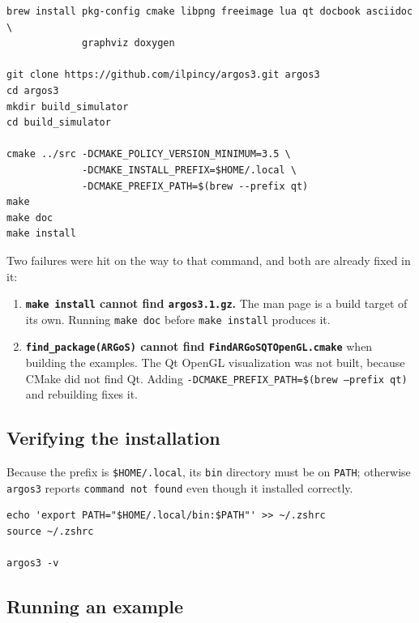 \begin{lstlisting}[style=shell,caption={Dependencies and source build.}]
brew install pkg-config cmake libpng freeimage lua qt docbook asciidoc \
             graphviz doxygen

git clone https://github.com/ilpincy/argos3.git argos3
cd argos3
mkdir build_simulator
cd build_simulator

cmake ../src -DCMAKE_POLICY_VERSION_MINIMUM=3.5 \
             -DCMAKE_INSTALL_PREFIX=$HOME/.local \
             -DCMAKE_PREFIX_PATH=$(brew --prefix qt)
make
make doc
make install
\end{lstlisting}

Two failures were hit on the way to that command, and both are already fixed in
it:

\begin{enumerate}
  \item \textbf{\texttt{make install} cannot find \texttt{argos3.1.gz}.} The man
        page is a build target of its own. Running \texttt{make doc} before
        \texttt{make install} produces it.
  \item \textbf{\texttt{find\_package(ARGoS)} cannot find
        \texttt{FindARGoSQTOpenGL.cmake}} when building the examples. The Qt
        OpenGL visualization was not built, because CMake did not find Qt.
        Adding \texttt{-DCMAKE\_PREFIX\_PATH=\$(brew --prefix qt)} and
        rebuilding fixes it.
\end{enumerate}

\subsection{Verifying the installation}
\label{sec:hw1-argos-verify}

Because the prefix is \texttt{\$HOME/.local}, its \texttt{bin} directory must be
on \texttt{PATH}; otherwise \texttt{argos3} reports \texttt{command not found}
even though it installed correctly.

\begin{lstlisting}[style=shell,caption={Putting the binary on PATH.}]
echo 'export PATH="$HOME/.local/bin:$PATH"' >> ~/.zshrc
source ~/.zshrc

argos3 -v
\end{lstlisting}

\subsection{Running an example}
\label{sec:hw1-argos-example}

